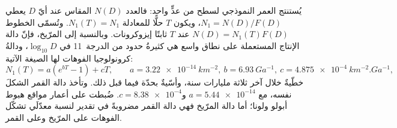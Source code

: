 يُستنتج العمر النموذجي لسطح من عدٍّ واحد: فالعدد $N(D)$ المقاس عند أيّ $D$
يعطي $N_1 = N(D)/F(D)$، ويكون $T$ حلًّا للمعادلة $N_1(T) = N_1$. وتُسمّى الخطوط
$N(D) = N_1(T)F(D)$ عند $T$ ثابتًا إيزوكرونات. وبالنسبة إلى المرّيخ، فإنّ دالة الإنتاج
المستعملة على نطاق واسع هي كثيرةُ حدود من الدرجة~11 في $\log_{10}D$، ودالةُ
كرونولوجيا الفوهات لها الصيغة الآتية:
\[
  N_1(T) = a\left(e^{bT} - 1\right) + cT , \qquad
  a = \qty{3.22e-14}{km^{-2}}, \ b = \qty{6.93}{Ga^{-1}}, \
  c = \qty{4.875e-4}{km^{-2}.Ga^{-1}} ,
\]
خطّيةٌ خلال آخر ثلاثة مليارات سنة، وأسّيةٌ بحدّة فيما قبل ذلك. وتأخذ دالة
القمر الشكلَ نفسه، مع $a = \num{5.44e-14}$ و$c =
\num{8.38e-4}$. ضُبطت على أعمار مواقع هبوط
أبولو ولونا؛ أما دالة المرّيخ فهي دالة القمر مضروبةً في تقدير لنسبة
معدّلَي تشكّل الفوهات على المرّيخ وعلى القمر.

